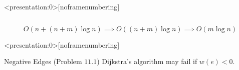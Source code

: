 
\begin{frame}<presentation:0>[noframenumbering]
  \centerline{}
\end{frame}

\begin{frame}
  \begin{center}
  \end{center}
\end{frame}

\begin{frame}
  \begin{columns}
	  
  \end{columns}

  \pause
  \vspace{0.60cm}
  \[
    O(n + (n+m) \log n) \implies O((n + m) \log n) \implies O(m \log n)
  \]
\end{frame}

\begin{frame}
  \begin{center}
	\resizebox{0.80\textwidth}{!}{}
  \end{center}
\end{frame}

\begin{frame}<presentation:0>[noframenumbering]
  \begin{exampleblock}{Negative Edges (Problem $11.1$)}
    Dijkstra's algorithm may fail if $w(e) < 0$.
  \end{exampleblock}

\end{frame}

